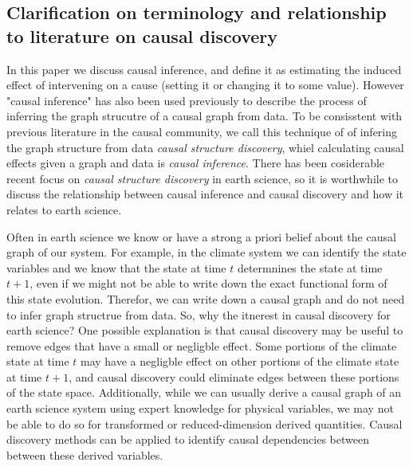 \documentclass[12pt]{article}
\begin{document}
\subsection{Clarification on terminology and relationship to literature on causal discovery}


In this paper we discuss causal inference, and define it as
estimating the induced effect of intervening on a cause (setting
it or changing it to some value). However "causal inference" has
also been used previously to describe the process of inferring the
graph strucutre of a causal graph from data. To be consisstent
with previous literature in the causal community, we call this
technique of of infering the graph structure from data \emph{causal
structure discovery}, whiel calculating causal effects given a
graph and data is \emph{causal inference}. There has been cosiderable
recent focus on \emph{causal structure discovery} in earth science, so
it is worthwhile to discuss the relationship between causal
inference and causal discovery and how it relates to earth science.


Often in earth science we know or have a strong a priori belief
about the causal graph of our system. For example, in the climate
system we can identify the state variables and we know that the
state at time \(t\) determnines the state at time \(t+1\), even if we
might not be able to write down the exact functional form of this
state evolution. Therefor, we can write down a causal graph and do
not need to infer graph structrue from data.  So, why the itnerest
in causal discovery for earth science? One possible explanation is
that causal discovery may be useful to remove edges that have a
small or negligble effect. Some portions of the climate state at
time \(t\) may have a negligble effect on other portions of the
climate state at time \(t+1\), and causal discovery could eliminate
edges between these portions of the state space.  Additionally,
while we can usually derive a causal graph of an earth science
system using expert knowledge for physical variables, we may not
be able to do so for transformed or reduced-dimension derived
quantities. Causal discovery methods can be applied to identify
causal dependencies between between these derived variables.

\end{document}
